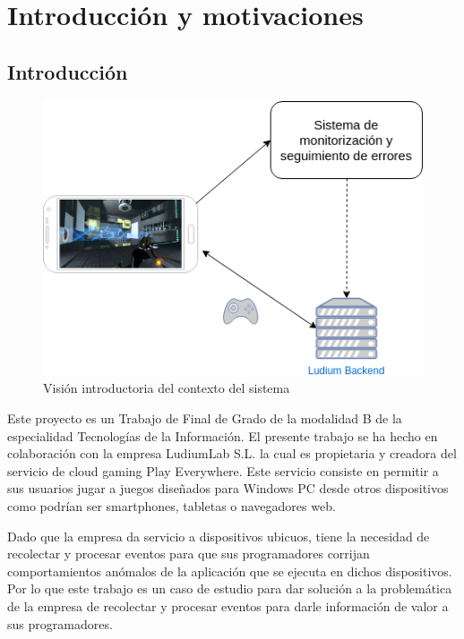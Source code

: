 \chapter{Introducción y motivaciones}

\section{Introducción}

\begin{figure}[!htb]
	\includegraphics[width=\linewidth] {Moduloss-Intro.png}
	\caption{Visión introductoria del contexto del sistema}
	\label{fig:intro}
\end{figure}

Este proyecto es un Trabajo de Final de Grado de la modalidad B de la especialidad Tecnologías de la Información. El presente trabajo se ha hecho en colaboración con la empresa LudiumLab S.L. la cual es propietaria y creadora del servicio de cloud gaming Play Everywhere. Este servicio consiste en permitir a sus usuarios jugar a juegos diseñados para Windows PC desde otros dispositivos como podrían ser smartphones, tabletas o navegadores web. 

Dado que la empresa da servicio a dispositivos ubicuos, tiene la necesidad de recolectar y procesar eventos para que sus programadores corrijan comportamientos anómalos de la aplicación que se ejecuta en dichos dispositivos. Por lo que este trabajo es un caso de estudio para dar solución a la problemática de la empresa de recolectar y procesar eventos para darle información de valor a sus programadores.

